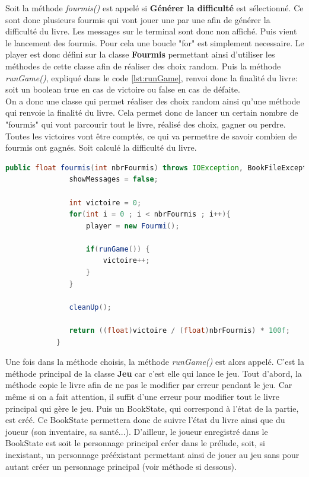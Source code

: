 		Soit la méthode \textit{fourmis()} est appelé si \textbf{Générer la difficulté} est sélectionné. Ce sont donc plusieurs fourmis qui vont jouer une par une afin de générer la difficulté du livre. Les messages sur le terminal sont donc non affiché. Puis vient le lancement des fourmis. Pour cela une boucle "for" est simplement necessaire. Le player est donc défini sur la classe \textbf{Fourmis} permettant ainsi d'utiliser les méthodes de cette classe afin de réaliser des choix random. Puis la méthode \textit{runGame()}, expliqué dans le code \ref{lst:runGame}, renvoi donc la finalité du livre: soit un boolean true en cas de victoire ou false en cas de défaite.\\
		On a donc une classe qui permet réaliser des choix random ainsi qu'une méthode qui renvoie la finalité du livre. Cela permet donc de lancer un certain nombre de "fourmis" qui vont parcourir tout le livre, réalisé des choix, gagner ou perdre. Toutes les victoires vont être comptés, ce qui va permettre de savoir combien de fourmis ont gagnés. Soit calculé la difficulté du livre.

		\begin{lstlisting}[gobble=12, language=java, caption=fourmis()]
			public float fourmis(int nbrFourmis) throws IOException, BookFileException {
			   showMessages = false;

			   int victoire = 0;
			   for(int i = 0 ; i < nbrFourmis ; i++){
				   player = new Fourmi();

				   if(runGame()) {
					   victoire++;
				   }
			   }

			   cleanUp();

			   return ((float)victoire / (float)nbrFourmis) * 100f;
			}
		\end{lstlisting}


		Une fois dans la méthode choisis, la méthode \textit{runGame()} est alors appelé. C'est la méthode principal de la classe \textbf{Jeu} car c'est elle qui lance le jeu.
		Tout d'abord, la méthode copie le livre afin de ne pas le modifier par erreur pendant le jeu. Car même si on a fait attention, il suffit d'une erreur pour modifier tout le livre principal qui gère le jeu. Puis un BookState, qui correspond à l'état de la partie, est créé. Ce BookState permettera donc de suivre l'état du livre ainsi que du joueur (son inventaire, sa santé...). D'ailleur, le joueur enregistré dans le BookState est soit le personnage principal créer dans le prélude, soit, si inexistant, un personnage prééxistant permettant ainsi de jouer au jeu sans pour autant créer un personnage principal (voir méthode si dessous).

